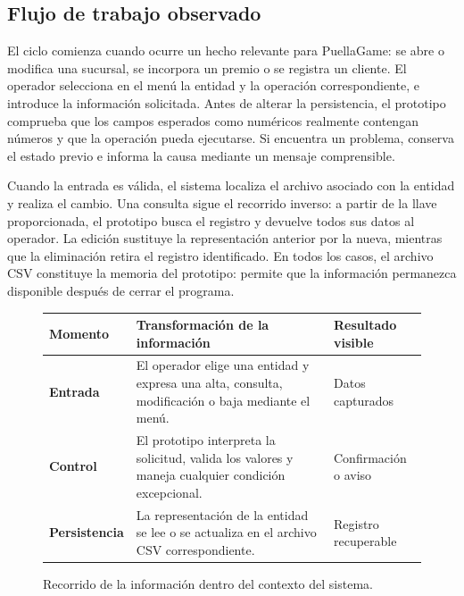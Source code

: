 \subsection{Flujo de trabajo observado}

El ciclo comienza cuando ocurre un hecho relevante para PuellaGame: se abre o
modifica una sucursal, se incorpora un premio o se registra un cliente. El
operador selecciona en el menú la entidad y la operación correspondiente, e
introduce la información solicitada. Antes de alterar la persistencia, el
prototipo comprueba que los campos esperados como numéricos realmente contengan
números y que la operación pueda ejecutarse. Si encuentra un problema, conserva
el estado previo e informa la causa mediante un mensaje comprensible.

Cuando la entrada es válida, el sistema localiza el archivo asociado con la
entidad y realiza el cambio. Una consulta sigue el recorrido inverso: a partir
de la llave proporcionada, el prototipo busca el registro y devuelve todos sus
datos al operador. La edición sustituye la representación anterior por la nueva,
mientras que la eliminación retira el registro identificado. En todos los casos,
el archivo CSV constituye la memoria del prototipo: permite que la información
permanezca disponible después de cerrar el programa.

\begin{figure}[htbp]
  \centering
  \small
  \renewcommand{\arraystretch}{1.45}
  \begin{tabularx}{0.96\textwidth}{@{}>{\bfseries}p{}X>{\centering\arraybackslash}p{}@{}}
    \toprule
    Momento & Transformación de la información & Resultado visible \\
    \midrule
    Entrada & El operador elige una entidad y expresa una alta, consulta,
    modificación o baja mediante el menú. & Datos capturados \\
    Control & El prototipo interpreta la solicitud, valida los valores y maneja
    cualquier condición excepcional. & Confirmación o aviso \\
    Persistencia & La representación de la entidad se lee o se actualiza en el
    archivo CSV correspondiente. & Registro recuperable \\
    \bottomrule
  \end{tabularx}
  \caption{Recorrido de la información dentro del contexto del sistema.}
  \label{fig:recorrido-informacion}
\end{figure}

